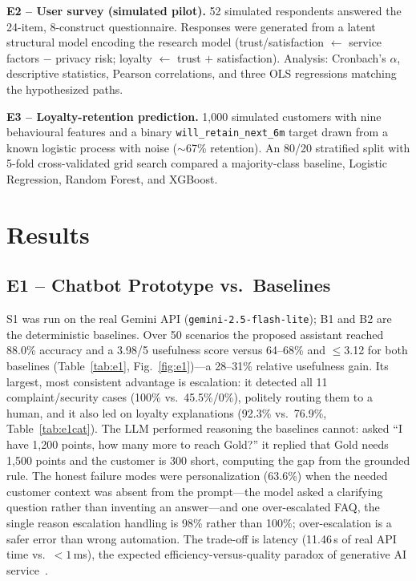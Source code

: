 \documentclass[runningheads]{llncs}
\begin{document}
\noindent\textbf{E2 -- User survey (simulated pilot).} 52 simulated respondents answered the 24-item, 8-construct questionnaire. Responses were generated from a latent structural model encoding the research model (trust/satisfaction $\leftarrow$ service factors $-$ privacy risk; loyalty $\leftarrow$ trust $+$ satisfaction). Analysis: Cronbach's $\alpha$, descriptive statistics, Pearson correlations, and three OLS regressions matching the hypothesized paths.

\noindent\textbf{E3 -- Loyalty-retention prediction.} 1{,}000 simulated customers with nine behavioural features and a binary \texttt{will\_retain\_next\_6m} target drawn from a known logistic process with noise ($\sim$67\% retention). An 80/20 stratified split with 5-fold cross-validated grid search compared a majority-class baseline, Logistic Regression, Random Forest, and XGBoost.

\section{Results}

\subsection{E1 -- Chatbot Prototype vs.\ Baselines}
S1 was run on the real Gemini API (\texttt{gemini-2.5-flash-lite}); B1 and B2 are the deterministic baselines. Over 50 scenarios the proposed assistant reached 88.0\% accuracy and a 3.98/5 usefulness score versus 64--68\% and $\le$3.12 for both baselines (Table~\ref{tab:e1}, Fig.~\ref{fig:e1})---a 28--31\% relative usefulness gain. Its largest, most consistent advantage is escalation: it detected all 11 complaint/security cases (100\% vs.\ 45.5\%/0\%), politely routing them to a human, and it also led on loyalty explanations (92.3\% vs.\ 76.9\%, Table~\ref{tab:e1cat}). The LLM performed reasoning the baselines cannot: asked ``I have 1{,}200 points, how many more to reach Gold?'' it replied that Gold needs 1{,}500 points and the customer is 300 short, computing the gap from the grounded rule. The honest failure modes were personalization (63.6\%) when the needed customer context was absent from the prompt---the model asked a clarifying question rather than inventing an answer---and one over-escalated FAQ, the single reason escalation handling is 98\% rather than 100\%; over-escalation is a safer error than wrong automation. The trade-off is latency (11.46\,s of real API time vs.\ ${<}1$\,ms), the expected efficiency-versus-quality paradox of generative AI service~\cite{ref07}.
\end{document}
